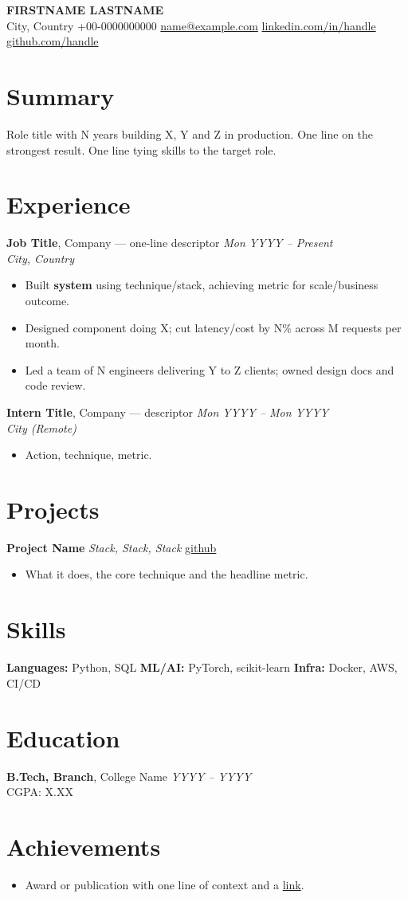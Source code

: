 \documentclass[letterpaper,10.5pt]{article}
\newcommand{\link}[2]{\href{#1}{\textcolor{linkblue}{#2}}}
\newcommand{\role}[4]{\textbf{#1}, #2 \hfill \textit{#4}\\\textit{#3}\vspace{1pt}}
\newcommand{\project}[4]{\textbf{#1} \textbar{} \textit{#2} \hfill \link{#4}{#3}\vspace{1pt}}
\begin{document}
\begin{center}
  {\LARGE\bfseries FIRSTNAME LASTNAME}\\[2pt]
  City, Country \textbar{} +00-0000000000 \textbar{}
  \link{mailto:name@example.com}{name@example.com} \textbar{}
  \link{https://www.linkedin.com/in/handle}{linkedin.com/in/handle} \textbar{}
  \link{https://github.com/handle}{github.com/handle}
\end{center}

\section{Summary}
Role title with N years building X, Y and Z in production. One line on the strongest result. One line tying skills to the target role.

\section{Experience}
\role{Job Title}{Company --- one-line descriptor}{City, Country}{Mon YYYY -- Present}
\begin{itemize}
  \item Built \textbf{system} using technique/stack, achieving metric for scale/business outcome.
  \item Designed component doing X; cut latency/cost by N\% across M requests per month.
  \item Led a team of N engineers delivering Y to Z clients; owned design docs and code review.
\end{itemize}

\role{Intern Title}{Company --- descriptor}{City (Remote)}{Mon YYYY -- Mon YYYY}
\begin{itemize}
  \item Action, technique, metric.
\end{itemize}

\section{Projects}
\project{Project Name}{Stack, Stack, Stack}{github}{https://github.com/handle/repo}
\begin{itemize}
  \item What it does, the core technique and the headline metric.
\end{itemize}

\section{Skills}
\textbf{Languages:} Python, SQL \quad
\textbf{ML/AI:} PyTorch, scikit-learn \quad
\textbf{Infra:} Docker, AWS, CI/CD

\section{Education}
\textbf{B.Tech, Branch}, College Name \hfill \textit{YYYY -- YYYY}\\
CGPA: X.XX

\section{Achievements}
\begin{itemize}
  \item Award or publication with one line of context and a \link{https://example.com}{link}.
\end{itemize}
\end{document}
